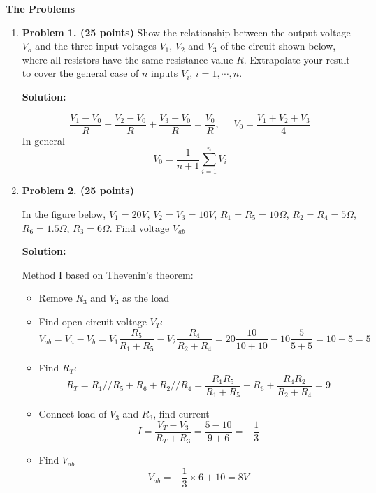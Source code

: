 {\bf The Problems}
\begin{enumerate}

\item {\bf Problem 1. (25 points)} 
Show the relationship between the output voltage $V_o$ and the three input
voltages $V_1$, $V_2$ and $V_3$ of the circuit shown below, where all 
resistors have the same resistance value $R$. Extrapolate your result to 
cover the general case of $n$ inputs $V_i$, $i=1,\cdots,n$.


{\bf Solution:}

\[ \frac{V_1-V_0}{R}+\frac{V_2-V_0}{R}+\frac{V_3-V_0}{R}=\frac{V_0}{R}
,\;\;\;\;\; V_0=\frac{V_1+V_2+V_3}{4}	\]
In general
\[ V_0=\frac{1}{n+1}\sum_{i=1}^n V_i \]

\item {\bf Problem 2. (25 points)} 

In the figure below, $V_1=20V$, $V_2=V_3=10V$, $R_1=R_5=10\Omega$, 
$R_2=R_4=5\Omega$, $R_6=1.5\Omega$, $R_3=6\Omega$. Find voltage $V_{ab}$


{\bf Solution:} 

Method I based on Thevenin's theorem:
\begin{itemize}
\item Remove $R_3$ and $V_3$ as the load
\item Find open-circuit voltage $V_T$:
\[	V_{ab}=V_a-V_b=V_1\frac{R_5}{R_1+R_5}-V_2\frac{R_4}{R_2+R_4}
	=20 \frac{10}{10+10}-10 \frac{5}{5+5}=10-5=5 \]
\item Find $R_T$:
\[	R_T=R_1//R_5+R_6+R_2//R_4
	=\frac{R_1R_5}{R_1+R_5}+R_6+\frac{R_4R_2}{R_2+R_4}=9 \]
\item Connect load of $V_3$ and $R_3$, find current
\[	I=\frac{V_T-V_3}{R_T+R_3}=\frac{5-10}{9+6}=-\frac{1}{3} \]
\item Find $V_{ab}$
\[	V_{ab}=-\frac{1}{3}\times 6 +10=8V	\]
\end{itemize}


\end{enumerate}
